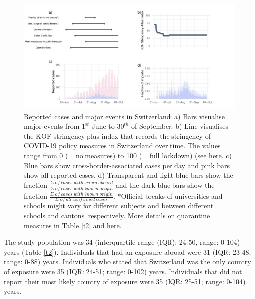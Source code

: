 \documentclass[10pt, a4paper, twoside]{article}
\begin{document}
\begin{multicols}{2}
\begin{figure}[h]
\centering
\includegraphics[scale=0.5]{Figure1_2021-04-19.pdf}
\caption{Reported cases and major events in Switzerland: a) Bars visualise major events from $1^{st}$ June to $30^{th}$ of September. b) Line visualises the KOF stringency plus index that records the stringency of COVID-19 policy measures in Switzerland over time. The values range from 0 (= no measures) to 100 (= full lockdown) (see \href{https://kof.ethz.ch/en/forecasts-and-indicators/indicators/kof-stringency-index.html}{here}. c) Blue bars show cross-border-associated cases per day and pink bars show all reported cases. d) Transparent and light blue bars show the fraction $\frac{\Sigma ~of ~cases ~with ~origin~aboard }{\Sigma ~of ~cases ~with ~known ~origin }$  and the dark blue bars show the fraction $\frac{\Sigma ~of ~cases ~with ~known ~origin }{\Sigma ~of ~all ~confirmed ~cases}$. $*$Official breaks of universities and schools might vary for different subjects and between different schools and cantons, respectively. More details on quarantine measures in Table \ref{t2} and \href{https://www.fedlex.admin.ch/eli/cc/2021/61/de}{here}.}
\label{f1}
\end{figure}

The study population was 34 (interquartile range (IQR): 24-50, range: 0-104) years (Table \ref{t2}).
Individuals that had an exposure abroad were 31 (IQR: 23-48; range: 0-88) years.
Individuals who stated that Switzerland was the only country of exposure were 35 (IQR: 24-51; range: 0-102) years.
Individuals that did not report their most likely country of exposure were 35 (IQR: 25-51; range: 0-104) years.


\end{multicols}
\end{document}
